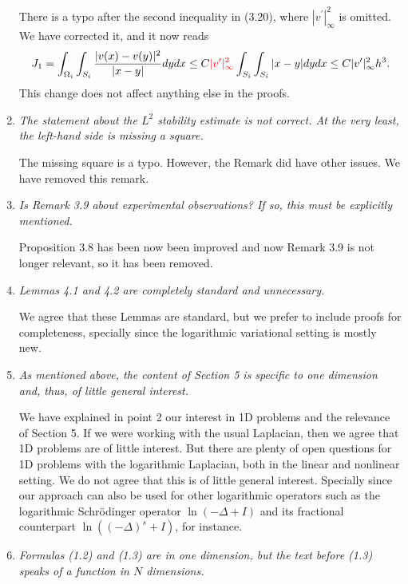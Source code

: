 \documentclass[11 pt]{article}
\numberwithin{equation}{section}
\begin{document}
\begin{enumerate}
    There is a typo after the second inequality in (3.20), where $|v^\prime|^2_{\infty}$ is omitted. We have corrected it, and it now reads
    \begin{equation*}
    J_1 = \int_{\Omega_i}\int_{S_i}\frac{|v(x)-v(y)|^2}{|x-y|}dy dx \leq C {
    \color{red}|v^\prime|^2_{\infty}}\int_{S_i}\int_{S_i}|x-y|dy dx \leq C{|v^\prime|^2_{\infty}}h^3.
\end{equation*}
This change does not affect anything else in the proofs.

    \item \emph{The statement about the \( L^2 \) stability estimate is not correct. At the very least, the left-hand side is missing a square.}

    The missing square is a typo.  However, the Remark did have other issues.  We have removed this remark.

    \item \emph{Is Remark 3.9 about experimental observations? If so, this must be explicitly mentioned.}

    Proposition 3.8 has been now been improved and now Remark 3.9 is not longer relevant, so it has been removed.

    \item \emph{Lemmas 4.1 and 4.2 are completely standard and unnecessary.}

    We agree that these Lemmas are standard, but we prefer to include proofs for completeness, specially since the logarithmic variational setting is mostly new.

    \item \emph{As mentioned above, the content of Section 5 is specific to one dimension and, thus, of little general interest.}

    We have explained in point 2 our interest in 1D problems and the relevance of Section 5.  If we were working with the usual Laplacian, then we agree that 1D problems are of little interest. But there are plenty of open questions for 1D problems with the logarithmic Laplacian, both in the linear and nonlinear setting.  We do not agree that this is of little general interest.  Specially since our approach can also be used for other logarithmic operators such as the logarithmic Schrödinger operator $\ln(-\Delta+I)$ and its fractional counterpart $\ln((-\Delta)^s+I)$, for instance.

    \item \emph{Formulas (1.2) and (1.3) are in one dimension, but the text before (1.3) speaks of a function in \( N \) dimensions.}


\end{enumerate}
\end{document}
